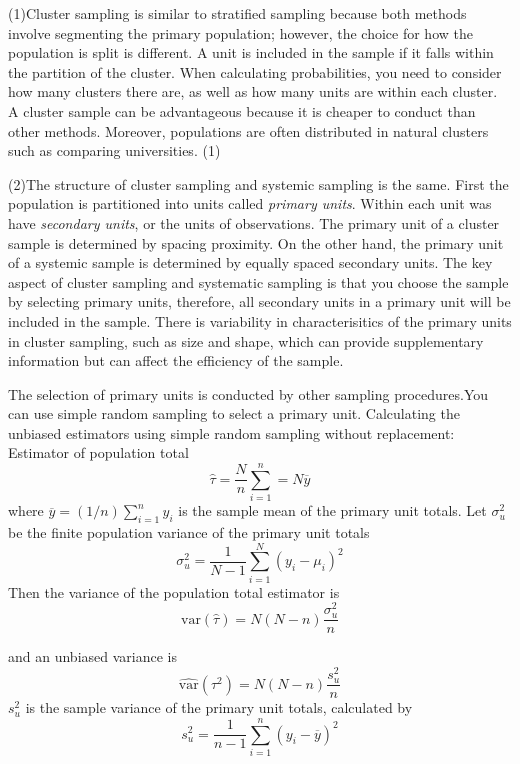 \documentclass[12pt,twoside]{reedthesis}
\begin{document}
(1)Cluster sampling is similar to stratified sampling because both methods involve segmenting the primary population; however, the choice for how the population is split is different. A unit is included in the sample if it falls within the partition of the cluster. When calculating probabilities, you need to consider how many clusters there are, as well as how many units are within each cluster. A cluster sample can be advantageous because it is cheaper to conduct than other methods. Moreover, populations are often distributed in natural clusters such as comparing universities. (1)

(2)The structure of cluster sampling and systemic sampling is the same. First the population is partitioned into units called \emph{primary units}. Within each unit was have \emph{secondary units}, or the units of observations. The primary unit of a cluster sample is determined by spacing proximity. On the other hand, the primary unit of a systemic sample is determined by equally spaced secondary units. The key aspect of cluster sampling and systematic sampling is that you choose the sample by selecting primary units, therefore, all secondary units in a primary unit will be included in the sample. There is variability in characterisitics of the primary units in cluster sampling, such as size and shape, which can provide supplementary information but can affect the efficiency of the sample.

The selection of primary units is conducted by other sampling procedures.You can use simple random sampling to select a primary unit. Calculating the unbiased estimators using simple random sampling without replacement:
Estimator of population total
\[
\hat{\tau} = \frac{N}{n}\sum^n_{i=1} = N\overline{y}
\]
where \(\overline{y} = (1/n)\sum^n_{i=1}y_i\) is the sample mean of the primary unit totals. Let \(\sigma^2_u\) be the finite population variance of the primary unit totals
\[
\sigma^2_u = \frac{1}{N-1}\sum^N_{i=1}(y_i-\mu_i)^2
\]
Then the variance of the population total estimator is
\[
\text{var}\left(\hat{\tau}\right) = N\left(N-n\right)\frac{\sigma^2_u}{n}
\]

and an unbiased variance is
\[
\widehat{\text{var}}\left(\tau^2\right) = N\left(N-n\right)\frac{s^2_u}{n}
\]
\(s^2_u\) is the sample variance of the primary unit totals, calculated by
\[
s_u^2 = \frac{1}{n-1}\sum^n_{i=1}\left(y_i-\overline{y}\right)^2
\]
\end{document}
